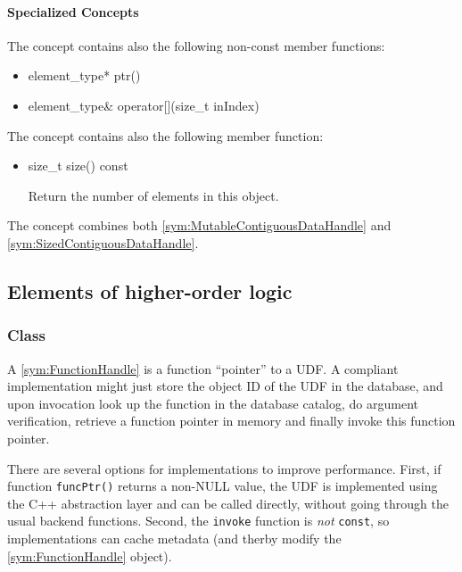 \paragraph{Specialized Concepts}

The concept  contains also the following non-const member functions:
%
\begin{itemize}
	\item
		\begin{cppsnippet}
		element_type* ptr()
		\end{cppsnippet}

	\item
		\begin{cppsnippet}
		element_type& operator[](size_t inIndex)
		\end{cppsnippet}
\end{itemize}
%
The concept  contains also the following member function:
%
\begin{itemize}
	\item
		\begin{cppsnippet}
		size_t size() const
		\end{cppsnippet}
		
		Return the number of elements in this object.
\end{itemize}
%
The concept  combines both \ref{sym:MutableContiguousDataHandle} and \ref{sym:SizedContiguousDataHandle}.


\subsection{Elements of higher-order logic}

\subsubsection[Class FunctionHandle]{Class }

A \ref{sym:FunctionHandle} is a function ``pointer'' to a UDF. A compliant implementation might just store the object ID of the UDF in the database, and upon invocation look up the function in the database catalog, do argument verification, retrieve a function pointer in memory and finally invoke this function pointer.

There are several options for implementations to improve performance. First, if function \texttt{funcPtr()} returns a non-NULL value, the UDF is implemented using the C++ abstraction layer and can be called directly, without going through the usual backend functions. Second, the \texttt{invoke} function is \emph{not} \texttt{const}, so implementations can cache metadata (and therby modify the \ref{sym:FunctionHandle} object).

